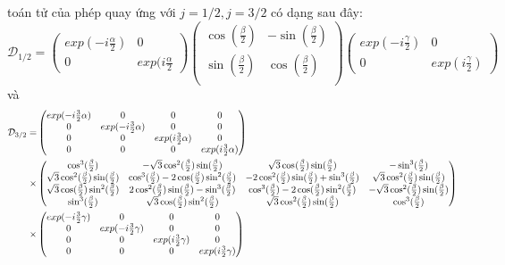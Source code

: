 toán tử của phép quay ứng với $j=1/2,j=3/2$ có dạng sau đây:
\begin{equation}
\mathcal{D}_{1/2}=\begin{pmatrix}
exp(-i\frac{\alpha}{2}) &0\\
0 &exp(i\frac{\alpha}{2}
\end{pmatrix}
\begin{pmatrix}
\cos(\frac{\beta}{2}) &-\sin(\frac{\beta}{2})\\
\sin(\frac{\beta}{2}) &\cos(\frac{\beta}{2})\\
\end{pmatrix}
\begin{pmatrix}
exp(-i\frac{\gamma}{2}) &0\\
0 &exp(i\frac{\gamma}{2})
\end{pmatrix}
\end{equation}
và
\begin{align}
\mathcal{D}_{3/2}=&\begin{pmatrix}
exp(-i\frac{3}{2}\alpha) &0 &0 &0\\
0 &exp(-i\frac{3}{2}\alpha) &0 &0 \\
0& 0& exp(i\frac{3}{2}\alpha) &0 \\
0 &0 &0 &exp(i\frac{3}{2}\alpha)
\end{pmatrix}\notag\\
\times&\begin{pmatrix}
\cos^{3}(\frac{\beta}{2}) &-\sqrt{3}\cos^{2}(\frac{\beta}{2})\sin(\frac{\beta}{2}) &\sqrt{3}\cos^{}(\frac{\beta}{2})\sin(\frac{\beta}{2}) &-\sin^{3}(\frac{\beta}{2})\\
\sqrt{3}\cos^{2}(\frac{\beta}{2})\sin(\frac{\beta}{2}) &\cos^{3}(\frac{\beta}{2})-2\cos(\frac{\beta}{2})\sin^{2}(\frac{\beta}{2}) &-2\cos^{2}(\frac{\beta}{2})\sin(\frac{\beta}{2}) +\sin^{3}(\frac{\beta}{2}) &\sqrt{3}\cos^{2}(\frac{\beta}{2})\sin(\frac{\beta}{2})\\
\sqrt{3}\cos(\frac{\beta}{2})\sin^{2}(\frac{\beta}{2}) &2\cos^{2}(\frac{\beta}{2})\sin(\frac{\beta}{2})-\sin^{3}(\frac{\beta}{2}) &\cos^{3}(\frac{\beta}{2})-2\cos(\frac{\beta}{2})\sin^{2}(\frac{\beta}{2}) &-\sqrt{3}\cos^{2}(\frac{\beta}{2})\sin(\frac{\beta}{2})\\
\sin^{3}(\frac{\beta}{2}) &\sqrt{3}\cos(\frac{\beta}{2})\sin^{2}(\frac{\beta}{2}) &\sqrt{3}\cos^{2}(\frac{\beta}{2})\sin(\frac{\beta}{2})  &\cos^{3}(\frac{\beta}{2})
\end{pmatrix}\notag\\
\times&\begin{pmatrix}
exp(-i\frac{3}{2}\gamma) &0 &0 &0\\
0 &exp(-i\frac{3}{2}\gamma) &0 &0 \\
0& 0&exp(i\frac{3}{2}\gamma) &0 \\
0 &0 &0 &exp(i\frac{3}{2}\gamma)
\end{pmatrix}
\end{align}
